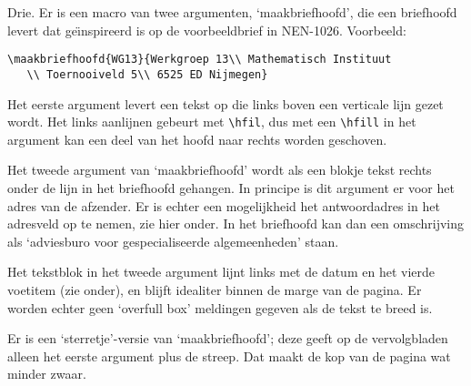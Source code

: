 Drie. Er is een macro van twee argumenten, `maakbriefhoofd',                    
die een briefhoofd levert dat ge\"\i nspireerd is op de                         
voorbeeldbrief in NEN-1026. Voorbeeld:                                          
\begin{verbatim}                                                                
\maakbriefhoofd{WG13}{Werkgroep 13\\ Mathematisch Instituut                     
   \\ Toernooiveld 5\\ 6525 ED Nijmegen}\end{verbatim}                          
Het eerste argument levert                                                      
een tekst op die links boven een verticale lijn gezet wordt.                    
Het links aanlijnen gebeurt met \verb.\hfil., dus met een                       
\verb.\hfill. in het argument kan een deel van het hoofd naar                   
rechts worden geschoven.                                                        
                                                                                
Het tweede argument van `maakbriefhoofd' wordt als een blokje tekst             
rechts onder de lijn in het briefhoofd gehangen.                                
In principe is dit argument er voor het adres van de afzender.                  
Er is echter een mogelijkheid  het antwoordadres                                
in het adresveld op te nemen, zie hier onder.                                   
In het briefhoofd kan dan een omschrijving als                                  
`adviesburo voor gespecialiseerde algemeenheden' staan.                         
                                                                                
Het tekstblok in het tweede argument lijnt links met de datum en                
het vierde voetitem (zie onder), en blijft idealiter binnen                     
de marge van de pagina. Er worden echter geen                                   
`overfull box' meldingen gegeven als de tekst te breed is.                      
                                                                                
Er is een `sterretje'-versie van `maakbriefhoofd';                              
deze geeft op de vervolgbladen alleen het eerste argument                       
plus de streep. Dat maakt de kop van de pagina wat minder                       
zwaar.                                                                          
                                                                                
